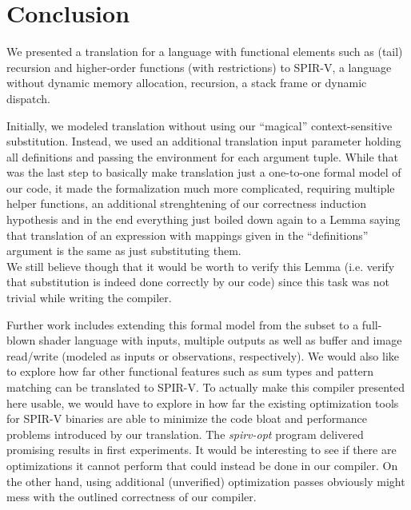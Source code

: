 \documentclass[letterpaper,12pt]{article}
\begin{document}
\section{Conclusion}

We presented a translation for a language with functional elements
such as (tail) recursion and higher-order functions (with restrictions)
to SPIR-V, a language without dynamic memory allocation, recursion,
a stack frame or dynamic dispatch.

Initially, we modeled translation without using our ``magical'' 
context-sensitive substitution. Instead, we used an additional
translation input parameter holding all definitions and passing
the environment for each argument tuple. While that was the last step to basically
make translation just a one-to-one formal model of our code, it made
the formalization much more complicated, requiring multiple helper functions,
an additional strenghtening of our correctness induction hypothesis
and in the end everything just boiled down again to a Lemma saying that
translation of an expression with mappings given in the ``definitions''
argument is the same as just substituting them. \\
We still believe though that it would be worth to verify this
Lemma (i.e. verify that substitution is indeed done correctly by our code)
since this task was not trivial while writing the compiler.

Further work includes extending this formal model from the subset
to a full-blown shader language with inputs, multiple outputs as
well as buffer and image read/write (modeled as inputs or observations,
respectively). We would also like to explore how far other functional
features such as sum types and pattern matching can be translated
to SPIR-V. To actually make this compiler presented here usable,
we would have to explore in how far the existing optimization tools
for SPIR-V binaries are able to minimize the code bloat and performance
problems introduced by our translation.
The \textit{spirv-opt} program delivered promising results in first experiments.
It would be interesting to see if there are optimizations it cannot perform
that could instead be done in our compiler. On the other hand, using additional
(unverified) optimization passes obviously might mess with the outlined correctness
of our compiler.
\end{document}
